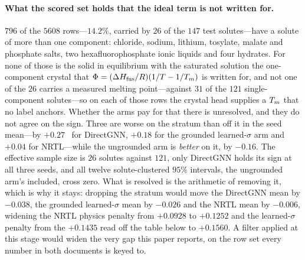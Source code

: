 \paragraph{What the scored set holds that the ideal term is not written for.} $796$ of the $5608$
rows---$14.2\%$, carried by $26$ of the $147$ test solutes---have a solute of more than one
component: chloride, sodium, lithium, tosylate, malate and phosphate salts, two
hexafluorophosphate ionic liquids and four hydrates. For none of those is the solid in equilibrium
with the saturated solution the one-component crystal that $\Phi=(\Delta H_{\mathrm{fus}}/R)(1/T-1/T_m)$ is
written for, and not one of the $26$ carries a measured melting point---against $31$ of the $121$
single-component solutes---so on each of those rows the crystal head supplies a $T_m$ that no label
anchors. Whether the arms pay for that there is unresolved, and they do not agree on the sign. Three are
worse on the stratum than off it in the seed mean---by $+0.27$ \lnx\ for DirectGNN, $+0.18$ for the
grounded learned-$\sigma$ arm and $+0.04$ for NRTL---while the ungrounded arm is \emph{better} on
it, by $-0.16$. The effective sample size is $26$ solutes against $121$, only DirectGNN holds its
sign at all three seeds, and all twelve solute-clustered $95\%$ intervals, the ungrounded arm's
included, cross zero.
What is resolved is the arithmetic of removing it, which is why it stays: dropping the stratum
would move the DirectGNN mean by $-0.038$, the grounded learned-$\sigma$ mean by $-0.026$ and the
NRTL mean by $-0.006$, widening the NRTL physics penalty from $+0.0928$ to $+0.1252$ and the
learned-$\sigma$ penalty from the $+0.1435$ read off the table below to $+0.1560$. A filter
applied at this stage would widen the very gap this paper reports, on the row set every number in
both documents is keyed to.

